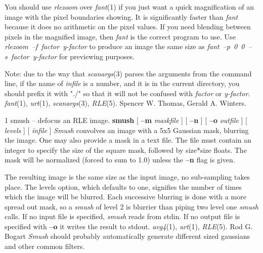 You should use
{\it rlezoom}
over
{\it fant}{\rm (1)}
if you just want a quick magnification of an image with the pixel
boundaries showing.  It is significantly faster than 
{\it fant}
because it does no arithmetic on the pixel values.
If you need blending between pixels in the magnified
image, then 
{\it fant}
is the correct program to use.  Use
{\it rlezoom\ --f\ factor\ y-factor}
to produce an image the same size as 
{\it fant\ --p\ 0\ 0\ --s\ factor\ y-factor}
for previewing purposes.

Note: due to the way that 
{\it scanargs}{\rm (3)}
parses the arguments from the command line, if the name of
{\it infile}
is a number, and it is in the current directory, you should prefix it
with "./" so that it will not be confused with
{\it factor}
or
{\it y-factor}{\rm .}
{\it fant}{\rm (1),}
{\it urt}{\rm (1),}
{\it scanargs}{\rm (3),}
{\it RLE}{\rm (5).}
Spencer W. Thomas,
Gerald A. Winters.
\newpage


%
%
%
 1
smush -- defocus an RLE image.
{\bf smush}
[ 
{\bf --m}
{\it maskfile}
] [
{\bf --n}
] [
{\bf --o}
{\it outfile} 
] [ 
{\it levels}
] [
{\it infile} 
]
{\it Smush}
convolves an image with a 5x5 Gaussian mask, blurring the image.  One 
may also provide a mask in a text file.  The file must contain an integer
to specify the size of the square mask, followed by size*size floats.
The mask will be normalized (forced to sum to 1.0) unless the 
{\bf --n}
flag is given. 

The resulting image is the same size as the input image, no sub-sampling takes
place.  The levels option, which defaults to one, signifies the number of
times which the image will be blurred.  Each successive blurring is done with
a more spread out mask, so a 
{\it smush}
of level 2 is blurrier than piping two level one
{\it smush}
calls.
If no input file is specified, 
{\it smush}
reads from stdin.  If no output file is specified with
{\bf --o}
it writes the result to stdout.
{\it avg4}{\rm (1),}
{\it urt}{\rm (1),}
{\it RLE}{\rm (5).}
Rod G. Bogart
{\it Smush}
should probably automatically generate different sized gaussians and other
common filters.



